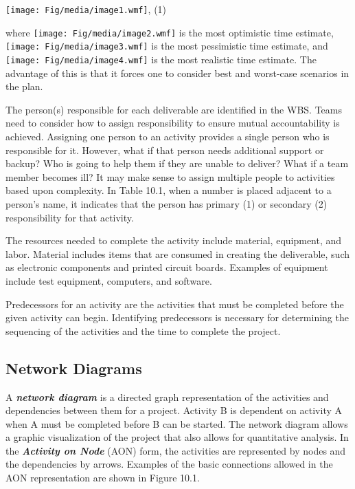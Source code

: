 \texttt{[image: Fig/media/image1.wmf]}, (1)

where \texttt{[image: Fig/media/image2.wmf]} is the most optimistic time
estimate, \texttt{[image: Fig/media/image3.wmf]} is the most pessimistic
time estimate, and \texttt{[image: Fig/media/image4.wmf]} is the most
realistic time estimate. The advantage of this is that it forces one to
consider best and worst-case scenarios in the plan.

The person(s) responsible for each deliverable are identified in the
WBS. Teams need to consider how to assign responsibility to ensure
mutual accountability is achieved. Assigning one person to an activity
provides a single person who is responsible for it. However, what if
that person needs additional support or backup? Who is going to help
them if they are unable to deliver? What if a team member becomes ill?
It may make sense to assign multiple people to activities based upon
complexity. In Table 10.1, when a number is placed adjacent to a
person's name, it indicates that the person has primary (1) or secondary
(2) responsibility for that activity.

The resources needed to complete the activity include material,
equipment, and labor. Material includes items that are consumed in
creating the deliverable, such as electronic components and printed
circuit boards. Examples of equipment include test equipment, computers,
and software.

Predecessors for an activity are the activities that must be completed
before the given activity can begin. Identifying predecessors is
necessary for determining the sequencing of the activities and the time
to complete the project.

\subsection{Network Diagrams}\label{network-diagrams}

A \emph{\textbf{network diagram}} is a directed graph representation of
the activities and dependencies between them for a project. Activity B
is dependent on activity A when A must be completed before B can be
started. The network diagram allows a graphic visualization of the
project that also allows for quantitative analysis. In the
\emph{\textbf{Activity on Node}} (AON) form, the activities are
represented by nodes and the dependencies by arrows. Examples of the
basic connections allowed in the AON representation are shown in Figure
10.1.

